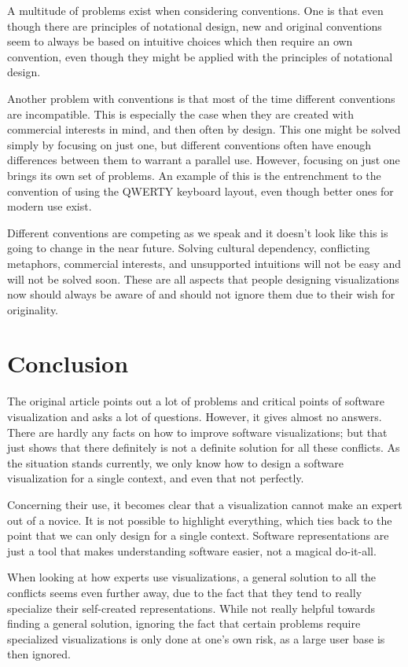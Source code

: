\documentclass[11pt, a4paper, ngerman, twoside]{article}
\theoremstyle{plain}\newtheorem{Lemma}{Lemma}
\theoremstyle{plain}\newtheorem{Satz}[Lemma]{Satz}
\theoremstyle{definition}\newtheorem{Definition}[Lemma]{Definition}
\theoremstyle{definition}\newtheorem*{Beispiel}{Beispiel}
\theoremstyle{remark}\newtheorem*{Bemerkung}{Bemerkung}
\begin{document}
A multitude of problems exist when considering conventions. One is that even though there are principles of notational design, new and original conventions seem to always be based on intuitive choices which then require an own convention, even though they might be applied with the principles of notational design\cite{ro}.

Another problem with conventions is that most of the time different conventions are incompatible. This is especially the case when they are created with commercial interests in mind, and then often by design. This one might be solved simply by focusing on just one, but different conventions often have enough differences between them to warrant a parallel use. However, focusing on just one brings its own set of problems. An example of this is the entrenchment to the convention of using the QWERTY keyboard layout, even though better ones for modern use exist.

Different conventions are competing as we speak and it doesn't look like this is going to change in the near future. Solving cultural dependency, conflicting metaphors, commercial interests, and unsupported intuitions will not be easy and will not be solved soon. These are all aspects that people designing visualizations now should always be aware of and should not ignore them due to their wish for originality.

\section{Conclusion}

The original article points out a lot of problems and critical points of software visualization and asks a lot of questions. However, it gives almost no answers. There are hardly any facts on how to improve software visualizations; but that just shows that there definitely is not a definite solution for all these conflicts. As the situation stands currently, we only know how to design a software visualization for a single context, and even that not perfectly.

Concerning their use, it becomes clear that a visualization cannot make an expert out of a novice. It is not possible to highlight everything, which ties back to the point that we can only design for a single context. Software representations are just a tool that makes understanding software easier, not a magical do-it-all.

When looking at how experts use visualizations, a general solution to all the conflicts seems even further away, due to the fact that they tend to really specialize their self-created representations. While not really helpful towards finding a general solution, ignoring the fact that certain problems require specialized visualizations is only done at one's own risk, as a large user base is then ignored.
\end{document}
